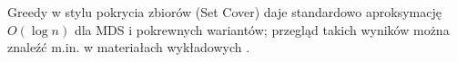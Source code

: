 Greedy w stylu pokrycia zbiorów (Set Cover) daje standardowo aproksymację $O(\log n)$ dla MDS i pokrewnych wariantów; przegląd takich wyników można znaleźć m.in. w materiałach wykładowych \cite{Kuhn2012NetworkAlgorithms}.












